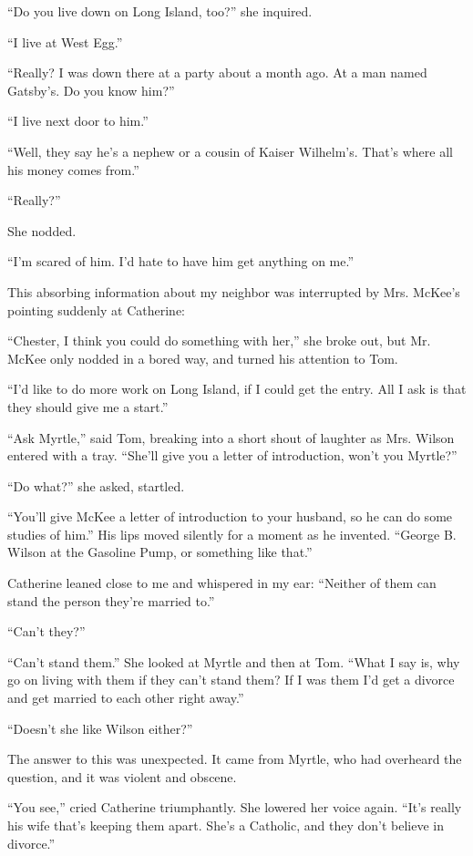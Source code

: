 \documentclass{znotebook}
\begin{document}
``Do you live down on Long Island, too?'' she inquired.

``I live at West Egg.''

``Really? I was down there at a party about a month ago. At a man named Gatsby’s. Do you know him?''

``I live next door to him.''

``Well, they say he’s a nephew or a cousin of Kaiser Wilhelm’s. That’s where all his money comes from.''

``Really?''

She nodded.

``I’m scared of him. I’d hate to have him get anything on me.''

This absorbing information about my neighbor was interrupted by Mrs. McKee’s pointing suddenly at Catherine:

``Chester, I think you could do something with her,'' she broke out, but Mr. McKee only nodded in a bored way, and turned his attention to Tom.

``I’d like to do more work on Long Island, if I could get the entry. All I ask is that they should give me a start.''

``Ask Myrtle,'' said Tom, breaking into a short shout of laughter as Mrs. Wilson entered with a tray. ``She’ll give you a letter of introduction, won’t you Myrtle?''

``Do what?'' she asked, startled.

``You’ll give McKee a letter of introduction to your husband, so he can do some studies of him.'' His lips moved silently for a moment as he invented. ``George B. Wilson at the Gasoline Pump, or something like that.''

Catherine leaned close to me and whispered in my ear: ``Neither of them can stand the person they’re married to.''

``Can’t they?''

``Can’t stand them.'' She looked at Myrtle and then at Tom. ``What I say is, why go on living with them if they can’t stand them? If I was them I’d get a divorce and get married to each other right away.''

``Doesn’t she like Wilson either?''

The answer to this was unexpected. It came from Myrtle, who had overheard the question, and it was violent and obscene.

``You see,'' cried Catherine triumphantly. She lowered her voice again. ``It’s really his wife that’s keeping them apart. She’s a Catholic, and they don’t believe in divorce.''
\end{document}
